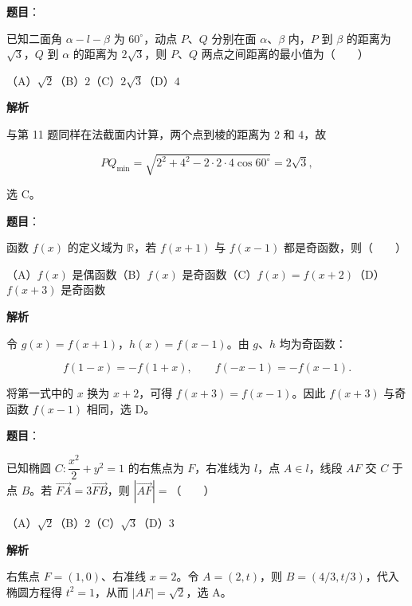 \begin{answer}

\textbf{题目}：

已知二面角 $\alpha-l-\beta$ 为 $60^\circ$，动点 $P\text{、}Q$ 分别在面 $\alpha\text{、}\beta$ 内，$P$ 到 $\beta$ 的距离为 $\sqrt3$，$Q$ 到 $\alpha$ 的距离为 $2\sqrt3$，则 $P\text{、}Q$ 两点之间距离的最小值为\mbox{（　　）}

（A）$\sqrt2$\quad（B）$2$\quad（C）$2\sqrt3$\quad（D）$4$

\textbf{解析}

与第 11 题同样在法截面内计算，两个点到棱的距离为 $2$ 和 $4$，故

\nopagebreak[4]
\[
PQ_{\min}=\sqrt{2^2+4^2-2\cdot2\cdot4\cos60^\circ}=2\sqrt3,
\]

选 C。


\end{answer}
\begin{answer}

\textbf{题目}：

函数 $f(x)$ 的定义域为 $\mathbb R$，若 $f(x+1)$ 与 $f(x-1)$ 都是奇函数，则\mbox{（　　）}

（A）$f(x)$ 是偶函数\quad（B）$f(x)$ 是奇函数\quad（C）$f(x)=f(x+2)$\quad（D）$f(x+3)$ 是奇函数

\textbf{解析}

令 $g(x)=f(x+1)$，$h(x)=f(x-1)$。由 $g\text{、}h$ 均为奇函数：

\nopagebreak[4]
\[
f(1-x)=-f(1+x),\qquad f(-x-1)=-f(x-1).
\]

将第一式中的 $x$ 换为 $x+2$，可得
$f(x+3)=f(x-1)$。因此 $f(x+3)$ 与奇函数 $f(x-1)$ 相同，选 D。


\end{answer}
\begin{answer}

\textbf{题目}：

已知椭圆 $C:\dfrac{x^2}{2}+y^2=1$ 的右焦点为 $F$，右准线为 $l$，点 $A\in l$，线段 $AF$ 交 $C$ 于点 $B$。若 $\overrightarrow{FA}=3\overrightarrow{FB}$，则 $|\overrightarrow{AF}|=$\mbox{（　　）}

（A）$\sqrt2$\quad（B）$2$\quad（C）$\sqrt3$\quad（D）$3$

\textbf{解析}

右焦点 $F=(1,0)$、右准线 $x=2$。令 $A=(2,t)$，则
$B=(4/3,t/3)$，代入椭圆方程得 $t^2=1$，从而 $|AF|=\sqrt2$，选 A。


\end{answer}
